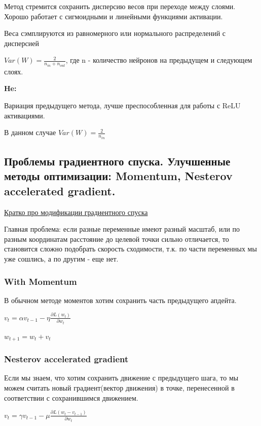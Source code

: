 \documentclass{article}
\begin{document}
Метод стремится сохранить дисперсию весов при переходе между слоями.
Хорошо работает с сигмоидными и линейными функциями активации.

Веса сэмплируются из равномерного или нормального распределений с дисперсией

$Var(W) = \frac{2}{n_{in} + n_{out}}$, где n - количество нейронов на предыдущем
и следующем слоях.

\textbf{He:}

Вариация предыдущего метода, лучше преспособленная для работы с ReLU
активациями.

В данном случае $Var(W) = \frac{2}{n_{in}}$


\subsection{Проблемы градиентного спуска. Улучшенные методы оптимизации: Momentum,
Nesterov accelerated gradient.}

\href{
	https://neerc.ifmo.ru/wiki/index.php?title=%
}{Кратко про модификации градиентного спуска}

Главная проблема: если разные переменные имеют разный масштаб, или по
разным координатам расстояние до целевой точки сильно отличается, то
становится сложно подобрать скорость сходимости, т.к. по части переменных
мы уже сошлись, а по другим - еще нет.

\subsubsection{With Momentum}

В обычном методе моментов хотим сохранить часть предыдущего апдейта.

$v_{t} = \alpha v_{t-1} - \eta \frac{\partial L(w_t)}{\partial w_t}$

$w_{t+1} = w_t + v_t$

\subsubsection{Nesterov accelerated gradient}

Если мы знаем, что хотим сохранить движение с предыдущего шага, то мы
можем считать новый градиент(вектор движения) в точке, перенесенной в
соответствии с сохранившимся движением.

$v_t = \gamma v_{t-1} - \mu \frac{\partial L (w_t - v_{t-1})}{\partial w_t}$
\end{document}
